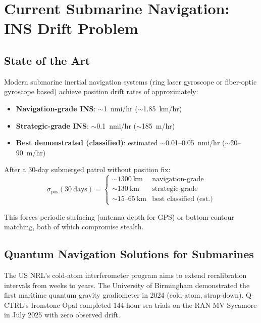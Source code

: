 \documentclass[11pt]{article}
\theoremstyle{definition}
\theoremstyle{remark}
\begin{document}
\section{Current Submarine Navigation: INS Drift Problem}
\label{sec:sub-ins}

\subsection{State of the Art}

Modern submarine inertial navigation systems (ring laser gyroscope
or fiber-optic gyroscope based) achieve position drift rates of
approximately:
\begin{itemize}[nosep]
  \item \textbf{Navigation-grade INS}: $\sim$1~nmi/hr
    ($\sim$1.85~km/hr)
  \item \textbf{Strategic-grade INS}: $\sim$0.1~nmi/hr
    ($\sim$185~m/hr)
  \item \textbf{Best demonstrated (classified)}: estimated
    $\sim$0.01--0.05~nmi/hr ($\sim$20--90~m/hr)
\end{itemize}

After a 30-day submerged patrol without position fix:
\begin{equation}
\sigma_{\mathrm{pos}}(30~\mathrm{days}) =
\begin{cases}
\sim 1300~\mathrm{km} & \text{navigation-grade} \\
\sim 130~\mathrm{km} & \text{strategic-grade} \\
\sim 15\text{--}65~\mathrm{km} & \text{best classified (est.)}
\end{cases}
\label{eq:ins-drift-30d}
\end{equation}

This forces periodic surfacing (antenna depth for GPS) or
bottom-contour matching, both of which compromise stealth.

\subsection{Quantum Navigation Solutions for Submarines}

The US NRL's cold-atom interferometer program aims to extend
recalibration intervals from weeks to years. The University of
Birmingham demonstrated the first maritime quantum gravity
gradiometer in 2024 (cold-atom, strap-down). Q-CTRL's Ironstone
Opal completed 144-hour sea trials on the RAN MV Sycamore in
July 2025 with zero observed drift.
\end{document}
